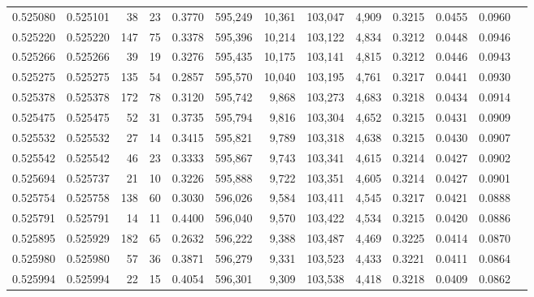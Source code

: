 \begin{tabular}{rrrrrrrrrrrrr}
0.525080 & 0.525101 &    38 &    23 &                                     0.3770 & 595,249 &  10,361 & 103,047 &   4,909 & 0.3215 & 0.0455 & 0.0960 \\
0.525220 & 0.525220 &   147 &    75 &                                     0.3378 & 595,396 &  10,214 & 103,122 &   4,834 & 0.3212 & 0.0448 & 0.0946 \\
0.525266 & 0.525266 &    39 &    19 &                                     0.3276 & 595,435 &  10,175 & 103,141 &   4,815 & 0.3212 & 0.0446 & 0.0943 \\
0.525275 & 0.525275 &   135 &    54 &                                     0.2857 & 595,570 &  10,040 & 103,195 &   4,761 & 0.3217 & 0.0441 & 0.0930 \\
0.525378 & 0.525378 &   172 &    78 &                                     0.3120 & 595,742 &   9,868 & 103,273 &   4,683 & 0.3218 & 0.0434 & 0.0914 \\
0.525475 & 0.525475 &    52 &    31 &                                     0.3735 & 595,794 &   9,816 & 103,304 &   4,652 & 0.3215 & 0.0431 & 0.0909 \\
0.525532 & 0.525532 &    27 &    14 &                                     0.3415 & 595,821 &   9,789 & 103,318 &   4,638 & 0.3215 & 0.0430 & 0.0907 \\
0.525542 & 0.525542 &    46 &    23 &                                     0.3333 & 595,867 &   9,743 & 103,341 &   4,615 & 0.3214 & 0.0427 & 0.0902 \\
0.525694 & 0.525737 &    21 &    10 &                                     0.3226 & 595,888 &   9,722 & 103,351 &   4,605 & 0.3214 & 0.0427 & 0.0901 \\
0.525754 & 0.525758 &   138 &    60 &                                     0.3030 & 596,026 &   9,584 & 103,411 &   4,545 & 0.3217 & 0.0421 & 0.0888 \\
0.525791 & 0.525791 &    14 &    11 &                                     0.4400 & 596,040 &   9,570 & 103,422 &   4,534 & 0.3215 & 0.0420 & 0.0886 \\
0.525895 & 0.525929 &   182 &    65 &                                     0.2632 & 596,222 &   9,388 & 103,487 &   4,469 & 0.3225 & 0.0414 & 0.0870 \\
0.525980 & 0.525980 &    57 &    36 &                                     0.3871 & 596,279 &   9,331 & 103,523 &   4,433 & 0.3221 & 0.0411 & 0.0864 \\
0.525994 & 0.525994 &    22 &    15 &                                     0.4054 & 596,301 &   9,309 & 103,538 &   4,418 & 0.3218 & 0.0409 & 0.0862 \\

\end{tabular}
